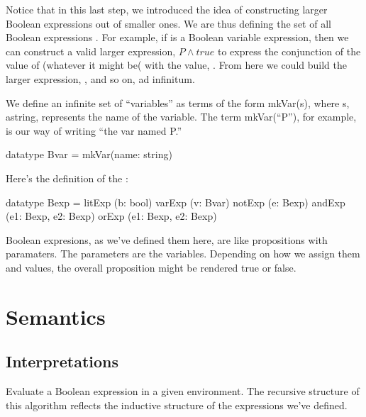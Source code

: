 \documentclass[letterpaper,10pt,english]{sphinxmanual}
\begin{document}
Notice that in this last step, we introduced the idea of constructing
larger Boolean expressions out of smaller ones. We are thus defining
the set of all Boolean expressions . For example, if 
is a Boolean variable expression, then we can construct a valid larger
expression, \(P \land true\) to express the conjunction of the
value of  (whatever it might be( with the value, . From here
we could build the larger expression, , and so
on, ad infinitum.

We define an infinite set of “variables” as terms of the form
mkVar(s), where s, astring, represents the name of the variable. The
term mkVar(“P”), for example, is our way of writing “the var named P.”

\begin{sphinxVerbatim}[commandchars=\\\{\}]
datatype Bvar = mkVar(name: string)
\end{sphinxVerbatim}

Here’s the definition of the :

\begin{sphinxVerbatim}[commandchars=\\\{\}]
datatype Bexp =
    litExp (b: bool) \textbar{}
    varExp (v: Bvar) \textbar{}
    notExp (e: Bexp) \textbar{}
    andExp (e1: Bexp, e2: Bexp) \textbar{}
    orExp (e1: Bexp, e2: Bexp)
\end{sphinxVerbatim}

Boolean expresions, as we’ve defined them here, are like propositions
with paramaters. The parameters are the variables. Depending on how we
assign them  and  values, the overall proposition might be
rendered true or false.


\section{Semantics}
\label{\detokenize{08-propositional-logic:semantics}}

\subsection{Interpretations}
\label{\detokenize{08-propositional-logic:interpretations}}
Evaluate a Boolean expression in a given environment.  The recursive
structure of this algorithm reflects the inductive structure of the
expressions we’ve defined.
\end{document}
